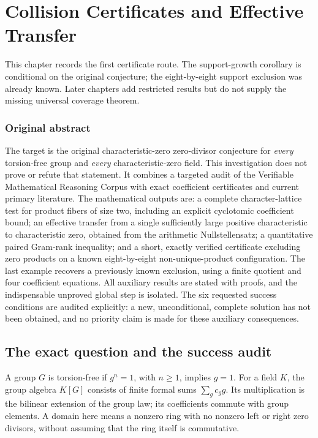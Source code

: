 \documentclass[11pt,a4paper,oneside]{report}
\theoremstyle{definition}
\theoremstyle{remark}
\newcommand{\compilationnote}[1]{\medskip\noindent{\small\color{accent}\textbf{Compilation note --- 23 November 2026.}}\par
{\small #1}\par\medskip}
\begin{document}
\chapter{Collision Certificates and Effective Transfer}\label{chap:M01}
\par
\compilationnote{This chapter records the first certificate route. The support-growth
corollary is conditional on the original conjecture; the eight-by-eight
support exclusion was already known. Later chapters add restricted results
but do not supply the missing universal coverage theorem.}
\subsection*{Original abstract}
The target is the original characteristic-zero zero-divisor conjecture for
\emph{every} torsion-free group and \emph{every} characteristic-zero field.
This investigation does not prove or refute that statement. It combines a
targeted audit of the Verifiable Mathematical Reasoning Corpus with exact
coefficient certificates and current primary literature. The mathematical
outputs are: a complete character-lattice test for product fibers of size two,
including an explicit cyclotomic coefficient bound; an effective transfer
from a single sufficiently large positive characteristic to characteristic
zero, obtained from the arithmetic Nullstellensatz; a quantitative paired
Gram-rank inequality; and a short, exactly verified certificate excluding
zero products on a known eight-by-eight non-unique-product configuration.
The last example recovers a previously known exclusion, using a finite
quotient and four coefficient equations. All auxiliary results are stated
with proofs, and the indispensable unproved global step is isolated. The
six requested success conditions are audited explicitly: a new,
unconditional, complete solution has not been obtained, and no priority
claim is made for these auxiliary consequences.
\medskip
\section{The exact question and the success audit}

A group $G$ is torsion-free if $g^n=1$, with $n\ge1$, implies $g=1$.
For a field $K$, the group algebra $K[G]$ consists of finite formal sums
$\sum_g c_g g$. Its multiplication is the bilinear extension of the group
law; its coefficients commute with group elements. A domain here means a
nonzero ring with no nonzero left or right zero divisors, without assuming
that the ring itself is commutative.
\end{document}
